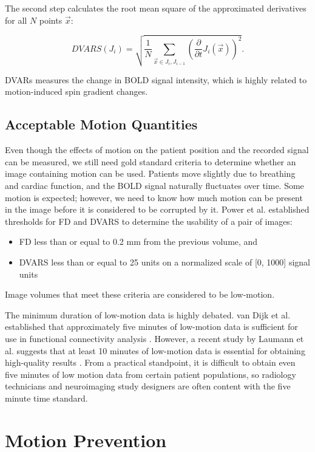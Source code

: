 The second step calculates the root mean square of the approximated derivatives for all $N$ points $\vec{x}$:

\begin{equation}
DVARS(J_i) = \sqrt{ \frac{1}{N} \sum_{\vec{x} \in J_i, J_{i-1}} \left( \frac{\partial}{\partial t} J_i(\vec{x}) \right)^2 }.
\end{equation}

DVARs measures the change in BOLD signal intensity, which is highly related to motion-induced spin gradient changes. 

\subsection{Acceptable Motion Quantities}

Even though the effects of motion on the patient position and the recorded signal can be measured, we still need gold standard criteria to determine whether an image containing motion can be used. Patients move slightly due to breathing and cardiac function, and the BOLD signal naturally fluctuates over time. Some motion is expected; however, we need to know how much motion can be present in the image before it is considered to be corrupted by it. Power et al. established thresholds for FD and DVARS to determine the usability of a pair of images:
\begin{itemize}
\item FD less than or equal to 0.2 mm from the previous volume, and
\item DVARS less than or equal to 25 units on a normalized scale of [0, 1000] signal units \cite{Power2014}
\end{itemize}

\noindent Image volumes that meet these criteria are considered to be low-motion.

The minimum duration of low-motion data is highly debated. van Dijk et al. established that approximately five minutes of low-motion data is sufficient for use in functional connectivity analysis \cite{VanDijk2012}. However, a recent study by Laumann et al. suggests that at least 10 minutes of low-motion data is essential for obtaining high-quality results \cite{Laumann2015}. From a practical standpoint, it is difficult to obtain even five minutes of low motion data from certain patient populations, so radiology technicians and neuroimaging study designers are often content with the five minute time standard. 

\section{Motion Prevention}

